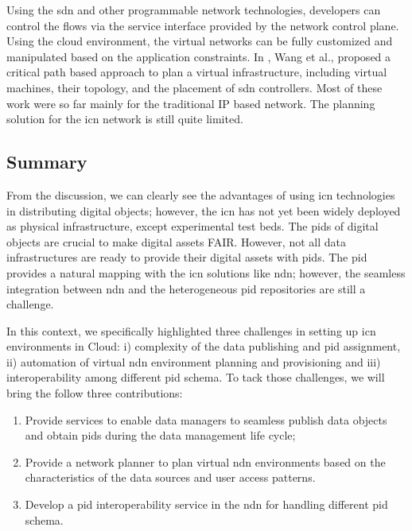 \documentclass[conference]{IEEEtran}
\begin{document}
Using the \gls{sdn} and other programmable network technologies, developers can control the flows via the service interface provided by the network control plane\cite{koulouzis_sdn-aware_2016}. Using the cloud environment, the virtual networks can be fully customized and manipulated based on the application constraints. In \cite{wang_planning_2017}\cite{wang_qos-aware_2017}, Wang et al., proposed a critical path based approach to plan a virtual infrastructure, including virtual machines, their topology, and the placement of \gls{sdn} controllers. Most of these work were so far mainly for the traditional IP based network. The planning solution for the \gls{icn} network is still quite limited. 



\subsection{Summary}
From the discussion, we can clearly see the advantages of using \gls{icn} technologies in distributing digital objects; however, the \gls{icn} has not yet been widely deployed as physical infrastructure, except experimental test beds. The \glspl{pid} of digital objects are crucial to make digital assets FAIR. However, not all data infrastructures are ready to provide their digital assets with \glspl{pid}. The \gls{pid} provides a natural mapping with the \gls{icn} solutions like \gls{ndn}; however, the seamless integration between \gls{ndn} and the heterogeneous \gls{pid} repositories are still a challenge.

In this context, we specifically highlighted three challenges in setting up \gls{icn} environments in Cloud: i) complexity of the data publishing and \gls{pid} assignment, ii) automation of virtual \gls{ndn} environment planning and provisioning and iii) interoperability among different \gls{pid} schema. 
To tack those challenges, we will bring the follow three contributions:
\begin{enumerate}
    \item Provide services to enable data managers to seamless publish data objects and obtain \glspl{pid} during the data management life cycle;
    \item Provide a network planner to plan virtual \gls{ndn} environments based on the characteristics of the data sources and user access patterns.
    \item Develop a \gls{pid} interoperability service in the \gls{ndn} for handling different \gls{pid} schema. 
\end{enumerate}
\end{document}
